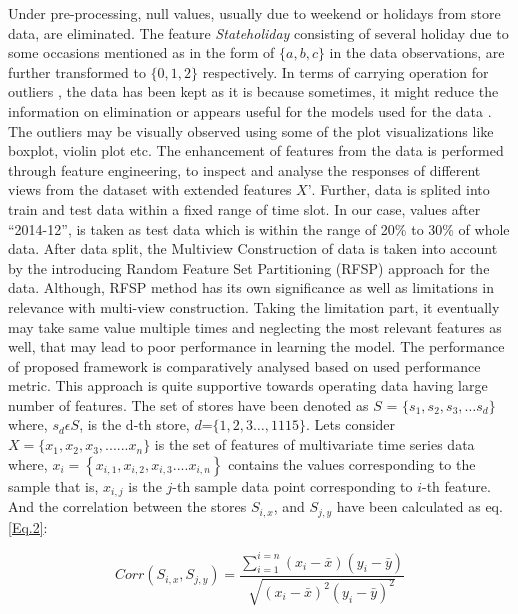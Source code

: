 Under pre-processing, null values, usually due to weekend or holidays from store data, are eliminated. The feature \textit{Stateholiday} consisting of several holiday due to some occasions mentioned as in the form of $\{a,b,c\}$ in the data observations, are further transformed to $\{0,1,2\}$ respectively. In terms of carrying operation for outliers \cite{kwak2017statistical}, the data has been kept as it is because sometimes, it might reduce the information on elimination or appears useful for the models used for the data \cite{toochaei2023evaluating}. The outliers may be visually observed using some of the plot visualizations like boxplot, violin plot etc. The enhancement of features from the data is performed through feature engineering, to inspect and analyse the responses of different views from the dataset with extended features $X’$. Further, data is splited into train and test data within a fixed range of time slot. In our case, values after “2014-12”, is taken as test data which is within the range of 20\% to 30\% of whole data. After data split, the Multiview Construction of data is taken into account by the introducing Random Feature Set Partitioning (RFSP) \cite{kumar2023review} approach for the data. Although, RFSP method has its own significance as well as limitations in relevance with multi-view construction. Taking the limitation part, it eventually may take same value multiple times and neglecting the most relevant features as well, that may lead to poor performance in learning the model. The performance of proposed framework is comparatively analysed based on used performance metric.
This approach is quite supportive towards operating data having large number of features. The set of stores have been denoted as $S$ = $\{s_{1},s_{2},s_{3}, \dots s_{d}\}$\\
where, $s_{d}\epsilon S$, is the d-th store, $d$=$\{1,2,3 \dots,1115\}$. Lets consider $X = \{x_{1}, x_{2}, x_{3},......x_{n}\}$ is the set of features of multivariate time series data where, $x_{i} = \left \{ x_{i,1}, x_{i,2}, x_{i,3}....x_{i,n} \right \}$ contains the values corresponding to the sample that is, $x_{i,j}$ is the $j$-th sample data point corresponding to $i$-th feature. And the correlation between the stores $S_{i,x}$, and $S_{j,y}$ have been calculated as eq.\ref{Eq.2}: 

\begin{equation}
\label{Eq.2}
    Corr(S_{i,x}, S_{j,y}) = \frac{\sum_{i=1}^{i=n}(x_i-\bar x)(y_i - \bar y)} {\sqrt{(x_i - \bar x)^2(y_i - \bar y)^2}}
\end{equation}


